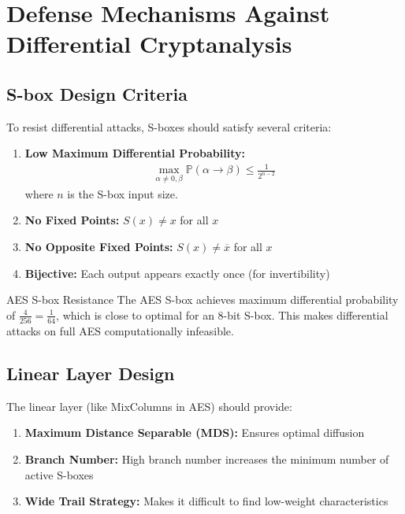 \documentclass[12pt,a4paper]{article}
\theoremstyle{definition}
\newcommand{\prob}{\mathbb{P}}
\begin{document}
\section{Defense Mechanisms Against Differential Cryptanalysis}

\subsection{S-box Design Criteria}

To resist differential attacks, S-boxes should satisfy several criteria:

\begin{enumerate}
    \item \textbf{Low Maximum Differential Probability:}
    \begin{align}
    \max_{\alpha \neq 0, \beta} \prob(\alpha \rightarrow \beta) \leq \frac{1}{2^{n-2}}
    \end{align}
    where $n$ is the S-box input size.
    
    \item \textbf{No Fixed Points:} $S(x) \neq x$ for all $x$
    
    \item \textbf{No Opposite Fixed Points:} $S(x) \neq \overline{x}$ for all $x$
    
    \item \textbf{Bijective:} Each output appears exactly once (for invertibility)
\end{enumerate}

\begin{examplebox}{AES S-box Resistance}
The AES S-box achieves maximum differential probability of $\frac{4}{256} = \frac{1}{64}$, which is close to optimal for an 8-bit S-box. This makes differential attacks on full AES computationally infeasible.
\end{examplebox}

\subsection{Linear Layer Design}

The linear layer (like MixColumns in AES) should provide:

\begin{enumerate}
    \item \textbf{Maximum Distance Separable (MDS):} Ensures optimal diffusion
    \item \textbf{Branch Number:} High branch number increases the minimum number of active S-boxes
    \item \textbf{Wide Trail Strategy:} Makes it difficult to find low-weight characteristics
\end{enumerate}
\end{document}

